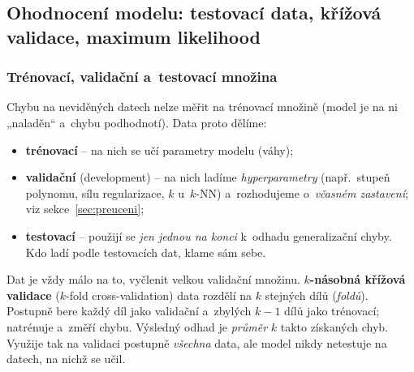 \subsection{Ohodnocení modelu: testovací data, křížová validace, maximum likelihood}

\subsubsection*{Trénovací, validační a~testovací množina}

Chybu na neviděných datech nelze měřit na trénovací množině (model je na ni „naladěn`` a~chybu podhodnotí). Data proto dělíme:
\begin{itemize}
  \item \textbf{trénovací} -- na nich se učí parametry modelu (váhy);
  \item \textbf{validační} (development) -- na nich ladíme \emph{hyperparametry} (např.\ stupeň polynomu, sílu regularizace, $k$ u~$k$-NN) a~rozhodujeme o~\emph{včasném zastavení}; viz sekce~\ref{sec:preuceni};
  \item \textbf{testovací} -- použijí se \emph{jen jednou na konci} k~odhadu generalizační chyby. Kdo ladí podle testovacích dat, klame sám sebe.
\end{itemize}

\begin{definice}
Dat je vždy málo na to, vyčlenit velkou validační množinu. \textbf{$k$-násobná křížová validace} ($k$-fold cross-validation) data rozdělí na $k$ stejných dílů (\emph{foldů}). Postupně bere každý díl jako validační a~zbylých $k-1$ dílů jako trénovací; natrénuje a~změří chybu. Výsledný odhad je \emph{průměr} $k$ takto získaných chyb. Využije tak na validaci postupně \emph{všechna} data, ale model nikdy netestuje na datech, na nichž se učil.
\end{definice}

\begin{center}
\end{center}

